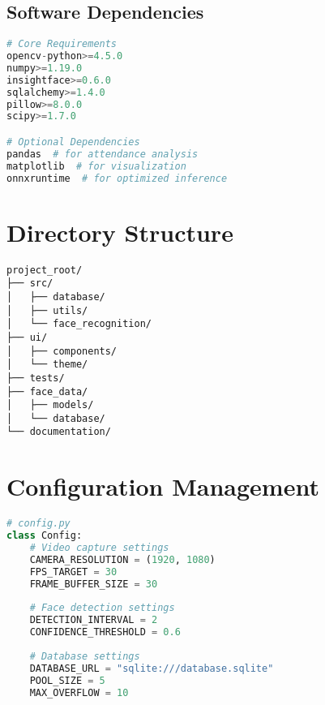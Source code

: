 \subsection{Software Dependencies}
\begin{lstlisting}[language=Python]
# Core Requirements
opencv-python>=4.5.0
numpy>=1.19.0
insightface>=0.6.0
sqlalchemy>=1.4.0
pillow>=8.0.0
scipy>=1.7.0

# Optional Dependencies
pandas  # for attendance analysis
matplotlib  # for visualization
onnxruntime  # for optimized inference
\end{lstlisting}

\section{Directory Structure}
\begin{lstlisting}
project_root/
├── src/
│   ├── database/
│   ├── utils/
│   └── face_recognition/
├── ui/
│   ├── components/
│   └── theme/
├── tests/
├── face_data/
│   ├── models/
│   └── database/
└── documentation/
\end{lstlisting}

\section{Configuration Management}
\begin{lstlisting}[language=Python]
# config.py
class Config:
    # Video capture settings
    CAMERA_RESOLUTION = (1920, 1080)
    FPS_TARGET = 30
    FRAME_BUFFER_SIZE = 30
    
    # Face detection settings
    DETECTION_INTERVAL = 2
    CONFIDENCE_THRESHOLD = 0.6
    
    # Database settings
    DATABASE_URL = "sqlite:///database.sqlite"
    POOL_SIZE = 5
    MAX_OVERFLOW = 10
\end{lstlisting}